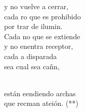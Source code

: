 \documentclass[12pt]{article}
\begin{document}
\begin{multicols*}{2}
\begin{cancion}
	y no  vuelve a cerrar,\\
	cada ro que es prohibido \\
	por trar de ilumin.\\
	Cada no que se extiende \\
	y no enentra receptor,\\
	cada a disparada \\
	sea cual sea  cañn,  \\\jump\\
	\begin{chorus}%
	están eendiendo archas\\
	que recman ateión. (**)\\
	\end{chorus}%
	\jump\\
\end{cancion}%


\end{multicols*}
\end{document}
